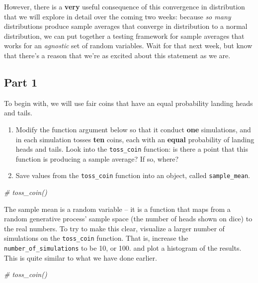 \documentclass[
]{book}
\newenvironment{Shaded}{\begin{snugshade}}{\end{snugshade}}
\newcommand{\CommentTok}[1]{\textcolor[rgb]{0.56,0.35,0.01}{\textit{#1}}}
\providecommand{\tightlist}{%
  \setlength{\itemsep}{0pt}\setlength{\parskip}{0pt}}
\theoremstyle{definition}
\theoremstyle{definition}
\theoremstyle{definition}
\theoremstyle{definition}
\theoremstyle{remark}
\begin{document}
However, there is a \textbf{very} useful consequence of this convergence in distribution that we will explore in detail over the coming two weeks: because \emph{so many} distributions produce sample averages that converge in distribution to a normal distribution, we can put together a testing framework for sample averages that works for an \emph{agnostic} set of random variables. Wait for that next week, but know that there's a reason that we're as excited about this statement as we are.

\hypertarget{part-1}{%
\subsection{Part 1}\label{part-1}}

To begin with, we will use fair coins that have an equal probability landing heads and tails.

\begin{enumerate}
\def\labelenumi{\arabic{enumi}.}
\tightlist
\item
  Modify the function argument below so that it conduct \textbf{one} simulations, and in each simulation tosses \textbf{ten} coins, each with an \textbf{equal} probability of landing heads and tails. Look into the \texttt{toss\_coin} function: is there a point that this function is producing a sample average? If so, where?
\item
  Save values from the \texttt{toss\_coin} function into an object, called \texttt{sample\_mean}.
\end{enumerate}

\begin{Shaded}
\begin{Highlighting}[]
\CommentTok{\# toss\_coin()}
\end{Highlighting}
\end{Shaded}

The sample mean is a random variable -- it is a function that maps from a random generative process' sample space (the number of heads shown on dice) to the real numbers. To try to make this clear, visualize a larger number of simulations on the \texttt{toss\_coin} function. That is, increase the \texttt{number\_of\_simulations} to be 10, or 100. and plot a histogram of the results. This is quite similar to what we have done earlier.

\begin{Shaded}
\begin{Highlighting}[]
\CommentTok{\# toss\_coin()}
\end{Highlighting}
\end{Shaded}
\end{document}
